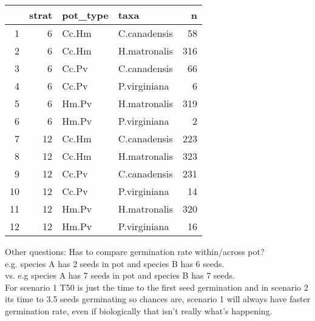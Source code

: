 \documentclass{article}\usepackage[]{graphicx}\usepackage[]{color}
\begin{document}
\begin{table}[ht]
\centering
\begin{tabular}{rrllr}
  \hline
 & strat & pot\_type & taxa & n \\ 
  \hline
1 &   6 & Cc.Hm & C.canadensis &  58 \\ 
  2 &   6 & Cc.Hm & H.matronalis & 316 \\ 
  3 &   6 & Cc.Pv & C.canadensis &  66 \\ 
  4 &   6 & Cc.Pv & P.virginiana &   6 \\ 
  5 &   6 & Hm.Pv & H.matronalis & 319 \\ 
  6 &   6 & Hm.Pv & P.virginiana &   2 \\ 
  7 &  12 & Cc.Hm & C.canadensis & 223 \\ 
  8 &  12 & Cc.Hm & H.matronalis & 323 \\ 
  9 &  12 & Cc.Pv & C.canadensis & 231 \\ 
  10 &  12 & Cc.Pv & P.virginiana &  14 \\ 
  11 &  12 & Hm.Pv & H.matronalis & 320 \\ 
  12 &  12 & Hm.Pv & P.virginiana &  16 \\ 
   \hline
\end{tabular}
\end{table}

Other questions: Has to compare germination rate within/across pot?\\
e.g. species A has 2 seeds in pot and species B has 6 seeds.\\
vs. e.g species A has 7 seeds in pot and species B has 7 seeds.\\ For scenario 1 T50 is just the time to the first seed germination and in scenario 2 its time to 3.5 seeds germinating so chances are, scenario 1 will always have faster germination rate, even if biologically that isn't really what's happening.
\end{document}
